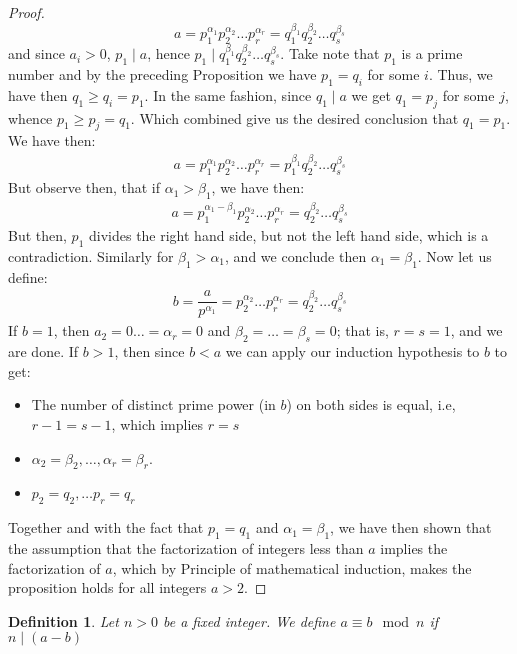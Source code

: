 \documentclass[11pt,a4paper]{article}
\newtheorem{define}{Definition}
\begin{document}
\begin{proof}
	\begin{equation*}
	a = p_1^{\alpha_1} p_2^{\alpha_2} \ldots p_r^{\alpha_r} = q_1^{\beta_1} q_2^{\beta_2} \ldots q_s^{\beta_s} 
	\end{equation*}
	and since $ a_i > 0 $, $ p_1 \mid a$, hence $ p_1 \mid q_1^{\beta_1} q_2^{\beta_2} \ldots q_s^{\beta_s} $. Take note that $p_1$ is a prime number and by the preceding Proposition we have $p_1 = q_i$ for some $i$. Thus, we have then $q_1 \geq q_i = p_1 $. In the same fashion, since $ q_1 \mid a$ we get $q_1 = p_j$ for some $j$, whence $ p_1 \geq p_j = q_1$. Which combined give us the desired conclusion that $ q_1 = p_1$. We have then:
	\begin{align*}
	 a = p_1^{\alpha_1} p_2^{\alpha_2} \ldots p_r^{\alpha_r} = p_1^{\beta_1} q_2^{\beta_2} \ldots q_s^{\beta_s} 
	\end{align*}
	But observe then, that if $\alpha_1 > \beta_1 $, we have then:
	\begin{align*}
	a = p_1^{\alpha_1 - \beta_1} p_2^{\alpha_2} \ldots p_r^{\alpha_r} = q_2^{\beta_2} \ldots q_s^{\beta_s} 
	\end{align*}
	But then, $p_1$ divides the right hand side, but not the left hand side, which is a contradiction. Similarly for $ \beta_1 > \alpha_1$, and we conclude then $ \alpha_1 = \beta_1$.
	Now let us define:
	\begin{align*}
	b = \dfrac{a}{p^{\alpha_1}} =
	 p_2^{\alpha_2} \ldots p_r^{\alpha_r} =  q_2^{\beta_2} \ldots q_s^{\beta_s}  
	\end{align*}
	If $b = 1$, then $a_2 = 0 \ldots = \alpha_r = 0$ and $ \beta_2 = \ldots = \beta_s = 0$; that is, $r =s =1$, and we are done. If $b > 1$, then since $b <a$ we can apply our induction hypothesis to $b$ to get:
	\begin{itemize}
		\item The number of distinct prime power (in $b$) on both sides is equal, i.e, $r -1 = s -1$, which implies $ r =s $
		\item $\alpha_2 = \beta_2, \ldots , \alpha_r = \beta_r $.
		\item $p_2 = q_2, \ldots p_r = q_r$ 
	\end{itemize}
	Together and with the fact that $ p_1 = q_1$ and $ \alpha_1 = \beta_1$, we have then shown that the assumption that the factorization of integers less than $a$ implies the factorization of $a$, which by Principle of mathematical induction, makes the proposition holds for all integers $ a > 2$.
\end{proof}
\begin{define}
	Let $n > 0 $ be a fixed integer. We define $ a \equiv b \mod{n}$ if $n \mid (a-b)$
\end{define}
\end{document}
